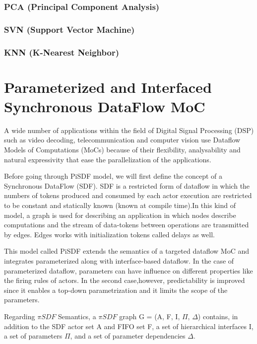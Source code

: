 	
 	\subsubsection{PCA (Principal Component Analysis)}              
 	\subsubsection{SVN (Support Vector Machine)}
 	\subsubsection{KNN (K-Nearest Neighbor)}

\section{Parameterized and Interfaced Synchronous DataFlow MoC} 
   A wide number of applications within the field of Digital Signal Processing (DSP) such as video decoding, telecommunication and computer vision use Dataflow Models of Computations (MoCs) because of their flexibility, analysability and natural expressivity that ease the parallelization of the applications.
   
   Before going through PiSDF model, we will first define the concept of a Synchronous DataFlow (SDF). SDF is a restricted form of dataflow in which the numbers of tokens produced and consumed by each actor execution are restricted to be constant and statically known (known at compile time)\cite{bhattacharya2001parameterized}.In this kind of model, a graph is used for describing an application in which nodes describe computations and the stream of data-tokens between operations are transmitted by edges. Edges works with initialization tokens called delays as well.
   
   This model called PiSDF extends the semantics of a targeted dataflow MoC and integrates parameterized along with interface-based dataflow. In the case of parameterized dataflow, parameters can have influence on different properties like the firing rules of actors. In the second case,however, predictability is improved since it enables a top-down parametrization and it limits the scope of the parameters. 
   
  Regarding $\pi SDF$ Semantics, a $\pi SDF$ \cite{desnos2013pimm} graph G = (A, F, I, $\Pi$, $\Delta$) contains, in addition to the SDF actor set A and FIFO set F, a set of hierarchical interfaces I, a set of parameters $\Pi$, and a set of parameter dependencies $\Delta$.
   
